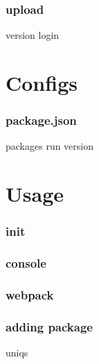 \documentclass{beamer}
\begin{document}
\begin{frame}
\frametitle{upload}
version
login
\end{frame}

\section{Configs}

\begin{frame}
\frametitle{package.json}
packages
run
version
\end{frame}

\begin{frame}
\frametitle{}

\end{frame}

\begin{frame}
\frametitle{}

\end{frame}

\begin{frame}
\frametitle{}

\end{frame}


\section{Usage}

\begin{frame}
\frametitle{init}

\end{frame}

\begin{frame}
\frametitle{console}

\end{frame}

\begin{frame}
\frametitle{webpack}

\end{frame}

\begin{frame}
\frametitle{adding package}
uniqs
\end{frame}
\end{document}
